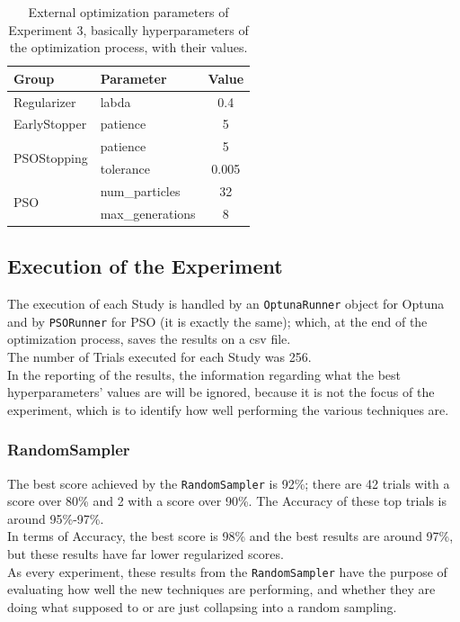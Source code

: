 \begin{table}[ht!]
	\center
	\setlength{\tabcolsep}{0.5cm}
	\caption[Optimization External Parameters of Experiment 3]{External optimization parameters of Experiment 3, basically hyperparameters of the optimization process, with their values.}
	\begin{tabular}{@{}llc@{}}
		\toprule
		\textbf{Group}               & \textbf{Parameter} & \textbf{Value} \\ \midrule
		Regularizer                  & labda              & 0.4            \\[0.1cm]
		EarlyStopper                 & patience           & 5              \\[0.2cm]
		\multirow{2}{*}{PSOStopping} & patience           & 5              \\[0.1cm]
									 & tolerance          & 0.005          \\[0.2cm]
		\multirow{2}{*}{PSO}         & num\_particles     & 32             \\[0.1cm]
									 & max\_generations   & 8              \\ \bottomrule
	\end{tabular}
	\label{tab:table-4.3.2}
\end{table}

\subsection{Execution of the Experiment}

The execution of each Study is handled by an \texttt{OptunaRunner} object for Optuna and by \texttt{PSORunner} for PSO (it is exactly the same); which, at the end of the optimization process, saves the results on a csv file.
\\[0.3cm]The number of Trials executed for each Study was 256.
\\[0.3cm]In the reporting of the results, the information regarding what the best hyperparameters' values are will be ignored, because it is not the focus of the experiment, which is to identify how well performing the various techniques are.

\subsubsection{RandomSampler}

The best score achieved by the \texttt{RandomSampler} is 92\%; there are 42 trials with a score over 80\% and 2 with a score over 90\%. The Accuracy of these top trials is around 95\%-97\%.
\\[0.3cm]In terms of Accuracy, the best score is 98\% and the best results are around 97\%, but these results have far lower regularized scores.
\\[0.3cm]As every experiment, these results from the \texttt{RandomSampler} have the purpose of evaluating how well the new techniques are performing, and whether they are doing what supposed to or are just collapsing into a random sampling.

